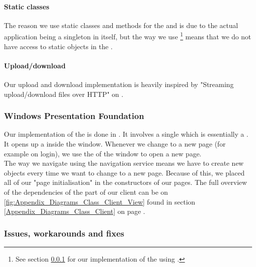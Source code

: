 \paragraph{Static classes}
The reason we use static classes and methods for the  and  is due to the actual application being a singleton in itself, but the way we use \footnote{See section \ref{Implementation_Client_Architecture_WPF} for our implementation of the  using .} means that we do not have access to static objects in the .

\paragraph{Upload/download} Our upload and download implementation is heavily inspired by "Streaming upload/download files over HTTP" on \cite{CODE:UPLDL}. 

\subsubsection{Windows Presentation Foundation}
\label{Implementation_Client_Architecture_WPF}
Our implementation of the  is done in . It involves a single  which is essentially a  . It opens up a  inside the window. Whenever we change to a new page (for example on login), we use the  of the window to open a new page.
\\The way we navigate using the navigation service means we have to create new  objects every time we want to change to a new page. Because of this, we placed all of our "page initialisation" in the constructors of our pages. The full overview of the dependencies of the  part of our client can be on \ref{fig:Appendix_Diagrams_Class_Client_View} found in section \ref{Appendix_Diagrams_Class_Client} on page \pageref{Appendix_Diagrams_Class_Client}.

\subsubsection{Issues, workarounds and fixes}
\label{Implementation_Client_Architecture_Issues}

